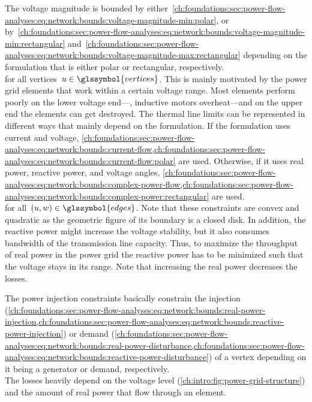 The voltage magnitude is bounded by
either~\cref{ch:foundations:sec:power-flow-analyses:eq:network:bounds:voltage-magnitude-min:polar},
or
by~\cref{ch:foundations:sec:power-flow-analyses:eq:network:bounds:voltage-magnitude-min:rectangular}
and~\cref{ch:foundations:sec:power-flow-analyses:eq:network:bounds:voltage-magnitude-max:rectangular}
depending on the formulation that is either polar or rectangular, respectively.
% 
\begin{subequations}
    
\end{subequations}
% 
for all vertices~$\vertexa\in\glssymbol{vertices}$. This is mainly motivated by
the power grid elements that work within a certain voltage range. 
% 
% 
Most elements perform poorly on the lower voltage end---\eg, inductive motors
over\-\mbox{heat---and} on the upper end the elements can get destroyed. The
thermal line limits can be represented in different ways that mainly depend on
the formulation. If the formulation uses current and
voltage, 
\cref{ch:foundations:sec:power-flow-analyses:eq:network:bounds:current-flow,ch:foundations:sec:power-flow-analyses:eq:network:bounds:current-flow:polar}
are used. Otherwise, if it uses real power, reactive power, and voltage
angles, 
\cref{ch:foundations:sec:power-flow-analyses:eq:network:bounds:complex-power-flow,ch:foundations:sec:power-flow-analyses:eq:network:bounds:complex-power:rectangular}
are used.
% 
\begin{subequations}
    
\end{subequations}
% 
for all~$(\vertexa,\vertexc)\in\glssymbol{edges}$. Note that these
constraints are convex and quadratic as the geometric figure of its boundary is
a closed disk. In addition, the reactive power might increase the voltage
stability, but it also consumes bandwidth of the transmission line capacity.
Thus, to maximize the throughput of real power in the power grid the reactive
power has to be minimized such that the voltage stays in its range. Note that
increasing the real power decreases the losses.

The power injection constraints basically constrain the injection (\cref{ch:foundations:sec:power-flow-analyses:eq:network:bounds:real-power-injection,ch:foundations:sec:power-flow-analyses:eq:network:bounds:reactive-power-injection}) or
demand (\cref{ch:foundations:sec:power-flow-analyses:eq:network:bounds:real-power-disturbance,ch:foundations:sec:power-flow-analyses:eq:network:bounds:reactive-power-disturbance})
of a vertex depending on it being a generator or demand, respectively.
% 
\begin{subequations}
    
    \label{ch:foundations:sec:power-flow-analyses:eq:injection-disturbance-bounds}
\end{subequations}
% 
The losses heavily depend on the voltage level
(\cref{ch:intro:fig:power-grid-structure}) and the amount of real power that
flow through an element.

